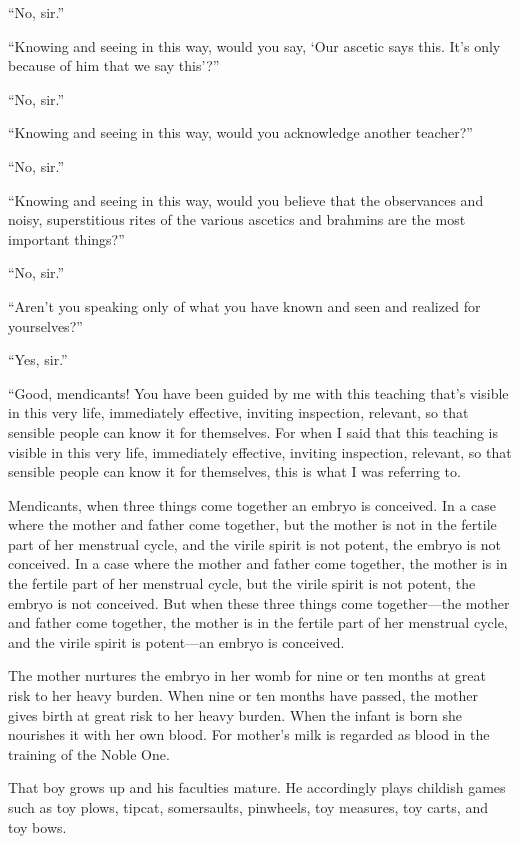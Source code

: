\documentclass[12pt,openany]{book}%
\begin{document}
“No, sir.” 

“Knowing and seeing in this way, would you say, ‘Our ascetic says this. It’s only because of him that we say this’?” 

“No, sir.” 

“Knowing and seeing in this way, would you acknowledge another teacher?” 

“No, sir.” 

“Knowing and seeing in this way, would you believe that the observances and noisy, superstitious rites of the various ascetics and brahmins are the most important things?” 

“No, sir.” 

“Aren’t you speaking only of what you have known and seen and realized for yourselves?” 

“Yes, sir.” 

“Good, mendicants! You have been guided by me with this teaching that’s visible in this very life, immediately effective, inviting inspection, relevant, so that sensible people can know it for themselves. For when I said that this teaching is visible in this very life, immediately effective, inviting inspection, relevant, so that sensible people can know it for themselves, this is what I was referring to. 

Mendicants, when three things come together an embryo is conceived. In a case where the mother and father come together, but the mother is not in the fertile part of her menstrual cycle, and the virile spirit is not potent, the embryo is not conceived. In a case where the mother and father come together, the mother is in the fertile part of her menstrual cycle, but the virile spirit is not potent, the embryo is not conceived. But when these three things come together—the mother and father come together, the mother is in the fertile part of her menstrual cycle, and the virile spirit is potent—an embryo is conceived. 

The mother nurtures the embryo in her womb for nine or ten months at great risk to her heavy burden. When nine or ten months have passed, the mother gives birth at great risk to her heavy burden. When the infant is born she nourishes it with her own blood. For mother’s milk is regarded as blood in the training of the Noble One. 

That boy grows up and his faculties mature. He accordingly plays childish games such as toy plows, tipcat, somersaults, pinwheels, toy measures, toy carts, and toy bows. 
\end{document}
